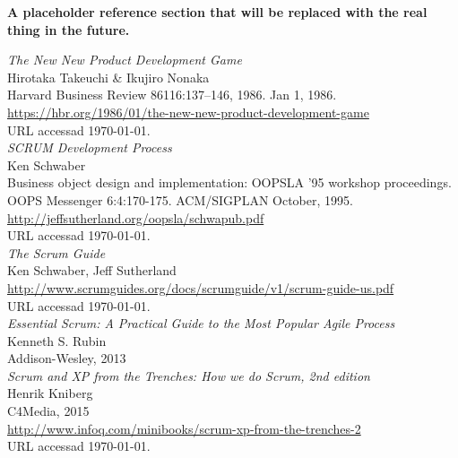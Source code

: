 \documentclass[a4paper,11pt,oneside]{report}
\begin{document}
\begin{thebibliography}{9}

  \textbf{A placeholder reference section that will be replaced with the real
    thing in the future.}

  \emph{The New New Product Development Game}\\
  \newblock Hirotaka Takeuchi \& Ikujiro Nonaka\\
  \newblock Harvard Business Review 86116:137–146, 1986. Jan 1, 1986.\\
  \newblock \url{https://hbr.org/1986/01/the-new-new-product-development-game}\\
  \newblock URL accessad \today.\\

 \emph{SCRUM Development Process}\\
  \newblock Ken Schwaber\\
  \newblock Business object design and implementation: OOPSLA '95
  workshop proceedings.\\
  \newblock OOPS Messenger 6:4:170-175. ACM/SIGPLAN October, 1995.\\
  \newblock \url{http://jeffsutherland.org/oopsla/schwapub.pdf}\\
  \newblock URL accessad \today.\\

 \emph{The Scrum Guide}\\
  \newblock Ken Schwaber, Jeff Sutherland\\
  \newblock
  \url{http://www.scrumguides.org/docs/scrumguide/v1/scrum-guide-us.pdf}\\
  \newblock URL accessad \today.\\

  \emph{Essential Scrum: A Practical Guide to
    the Most Popular Agile Process}\\
  \newblock Kenneth S. Rubin\\
  \newblock Addison-Wesley, 2013\\

  \emph{Scrum and XP from the Trenches: How we do Scrum, 2nd edition}\\
  \newblock Henrik Kniberg\\
  \newblock C4Media, 2015\\
  \newblock \url{http://www.infoq.com/minibooks/scrum-xp-from-the-trenches-2}\\
  \newblock URL accessad \today.\\


\end{thebibliography}
\end{document}
